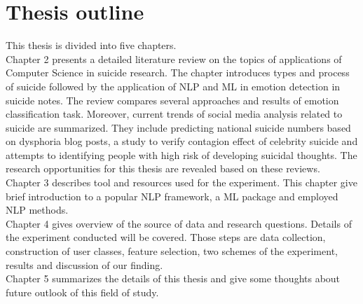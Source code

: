 \section{Thesis outline}
This thesis is divided into five chapters.\\
Chapter 2 presents a detailed literature review on the topics of applications of Computer Science in suicide research. The chapter introduces types and process of suicide followed by the application of NLP and ML in emotion detection in suicide notes. The review compares several approaches and results of emotion classification task. Moreover, current trends of social media analysis related to suicide are summarized. They include predicting national suicide numbers based on dysphoria blog posts, a study to verify contagion effect of celebrity suicide and attempts to identifying people with high risk of developing suicidal thoughts. The research opportunities for this thesis are revealed based on these reviews.\\
Chapter 3 describes tool and resources used for the experiment. This chapter give brief introduction to a popular NLP framework, a ML package and employed NLP methods.\\
Chapter 4 gives overview of the source of data and research questions. Details of the experiment conducted will be covered. Those steps are data collection, construction of user classes, feature selection, two schemes of the experiment, results and discussion of our finding.\\
Chapter 5 summarizes the details of this thesis and give some thoughts about future outlook of this field of study.\\



